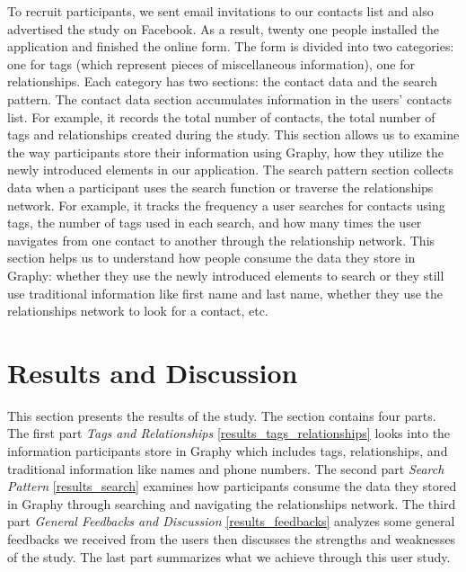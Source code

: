 To recruit participants, we sent email invitations to our contacts list and also advertised the study on Facebook. As a result, twenty one people installed the application and finished the online form. The form is divided into two categories: one for tags (which represent pieces of miscellaneous information), one for relationships. Each category has two sections: the contact data and the search pattern. The contact data section accumulates information in the users' contacts list. For example, it records the total number of contacts, the total number of tags and relationships created during the study. This section allows us to examine the way participants store their information using Graphy, how they utilize the newly introduced elements in our application. The search pattern section collects data when a participant uses the search function or traverse the relationships network. For example, it tracks the frequency a user searches for contacts using tags, the number of tags used in each search, and how many times the user navigates from one contact to another through the relationship network. This section helps us to understand how people consume the data they store in Graphy: whether they use the newly introduced elements to search or they still use traditional information like first name and last name, whether they use the relationships network to look for a contact, etc.
\section{Results and Discussion}
This section presents the results of the study. The section contains four parts. The first part \textit{Tags and Relationships} \ref{results_tags_relationships} looks into the information participants store in Graphy which includes tags, relationships, and traditional information like names and phone numbers. The second part \textit{Search Pattern} \ref{results_search} examines how participants consume the data they stored in Graphy through searching and navigating the relationships network. The third part \textit{General Feedbacks and Discussion} \ref{results_feedbacks} analyzes some general feedbacks we received from the users then discusses the strengths and weaknesses of the study. The last part summarizes what we achieve through this user study.
